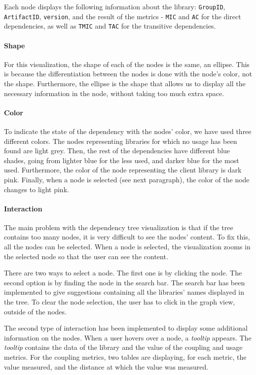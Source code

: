 Each node displays the following information about the library: \texttt{GroupID}, \texttt{ArtifactID}, \texttt{version}, and the result of the metrics - \texttt{MIC} and \texttt{AC} for the direct dependencies, as well as \texttt{TMIC} and \texttt{TAC} for the transitive dependencies.

\paragraph{Shape}
For this visualization, the shape of each of the nodes is the same, an ellipse. This is because the differentiation between the nodes is done with the node's color, not the shape. Furthermore, the ellipse is the shape that allows us to display all the necessary information in the node, without taking too much extra space.

\paragraph{Color}
To indicate the state of the dependency with the nodes' color, we have used three different colors. The nodes representing libraries for which no usage has been found are light grey. Then, the rest of the dependencies have different blue shades, going from lighter blue for the less used, and darker blue for the most used. Furthermore, the color of the node representing the client library is dark pink. Finally, when a node is selected (see next paragraph), the color of the node changes to light pink.

\paragraph{Interaction}
The main problem with the dependency tree visualization is that if the tree contains too many nodes, it is very difficult to see the nodes' content. To fix this, all the nodes can be selected. When a node is selected, the visualization zooms in the selected node so that the user can see the content.

There are two ways to select a node. The first one is by clicking the node. The second option is by finding the node in the search bar. The search bar has been implemented to give suggestions containing all the libraries' names displayed in the tree. To clear the node selection, the user has to click in the graph view, outside of the nodes.

The second type of interaction has been implemented to display some additional information on the nodes. When a user hovers over a node, a \textit{tooltip} appears. The \textit{tooltip} contains the data of the library and the value of the coupling and usage metrics. For the coupling metrics, two tables are displaying, for each metric, the value measured, and the distance at which the value was measured.


